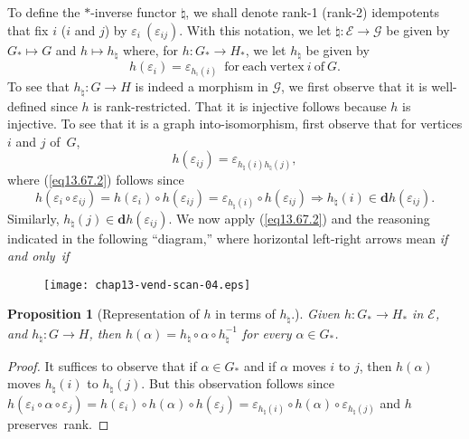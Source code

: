 \documentclass{surv-l}
\numberwithin{equation}{section}
\numberwithin{table}{section}
\numberwithin{figure}{section}
\theoremstyle{plain}
\newtheorem{proposition}[equation]{Proposition}
\theoremstyle{definition}
\begin{document}
To define the $*$-inverse functor ${\natural}$, we shall
denote rank-1 (rank-2) idempotents that fix $i$ ($i$ and $j$)
by $\varepsilon_{i}\ (\varepsilon_{ij})$. With this notation, we
let $\natural : \mathcal{E}\rightarrow \mathcal{G}$ be
given by $G_{\ast}\mapsto G$ and $h\mapsto h_{\natural}$
where, for $h:G_{\ast}\rightarrow H_{\ast}$, we let
$h_{\natural}$ be given by
\begin{equation}\label{eq13.67.1}
h(\varepsilon_{i})=\varepsilon_{h_{^{\natural}}(i)}\enspace
\mathrm{for\ each\ vertex}\ i\ \mathrm{of}\ G.
\end{equation}
To see that $h_{\natural} : G\rightarrow H$ is indeed a
morphism in $\mathcal{G}$, we first observe that it is
well-defined since $h$ is rank-restricted. That it is
injective follows because $h$ is injective. To see that it is
a graph into-isomorphism, first observe that for vertices $i$
and $j$ of~$G$,
\begin{equation}\label{eq13.67.2}
h(\varepsilon_{ij})=\varepsilon_{h_{\natural}(i)h_{\natural}(j)},
\end{equation}
where (\ref{eq13.67.2}) follows since
\[
h(\varepsilon_{i}\circ\varepsilon_{ij})=h(\varepsilon_{i})\circ h(\varepsilon_{ij})
=\varepsilon_{h_{\natural}(i)}\circ h(\varepsilon_{ij})\Rightarrow
h_{\natural}(i)\in \mathbf{d}h(\varepsilon_{ij}).
\]
Similarly, $ h_{\natural}(j)\in
\textbf{d}h(\varepsilon_{ij})$. We now apply (\ref{eq13.67.2}) and
the reasoning indicated in the following ``diagram,'' where
horizontal left-right arrows mean \emph{if and only~if}
\begin{figure}[!h]
\texttt{[image: chap13-vend-scan-04.eps]}
\end{figure}

\begin{proposition}[Representation of $h$ in terms
of $h_{\natural}.$]\label{prop13.67.3} Given
 $h:G_{\ast}\rightarrow H_{\ast}$ in $\mathcal{E}$, and
$h_{\natural} : G\rightarrow H$, then
$h(\alpha)=h_{\natural}\circ \alpha \circ
h_{\natural}^{-1}$ for every $\alpha\in G_{\ast}$.
\end{proposition}

\begin{proof}It suffices to observe that if $\alpha\in G_{\ast}$ and if
$\alpha$ moves $i$ to $j$, then $h(\alpha)$ moves
$h_{\natural}(i)$ to $h_{\natural}(j)$. But this
observation follows since
$h(\varepsilon_{i}\circ\alpha\circ\varepsilon_{j})=
h(\varepsilon_{i})\circ h(\alpha)\circ
h(\varepsilon_{j})=\varepsilon_{h_{\natural}(i)}\circ
h(\alpha)\circ\varepsilon_{h_{\natural}(j)}$ and $h$
preserves~rank.
\end{proof}
\end{document}
